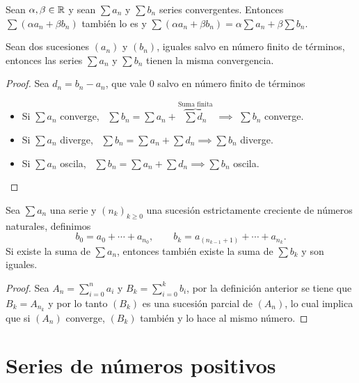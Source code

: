 \begin{prop}[Linealidad]
    Sean $\alpha, \beta \in \mathbb{R}$ y sean $\sum a_n$ y $\sum b_n$ series convergentes.
    Entonces $\sum (\alpha a_n + \beta b_n)$ también lo es y $\sum (\alpha a_n + \beta b_n)
    = \alpha \sum a_n + \beta \sum b_n$.
\end{prop}

\begin{prop}
    Sean dos sucesiones $(a_n)$ y $(b_n)$, iguales salvo en número finito de términos,
    entonces las series $\sum a_n$ y $\sum b_n$ tienen la misma convergencia.
\end{prop}

\begin{proof}
    Sea $d_n = b_n - a_n$, que vale 0 salvo en número finito de términos
    \begin{itemize}
        \item Si $\sum a_n$ converge, \, $\sum b_n = \sum a_n +
        \overbrace{\sum d_n}^\text{Suma finita}$ $\implies$ $\sum b_n$ converge.
        \item Si $\sum a_n$ diverge, \, $\sum b_n = \sum a_n + \sum d_n
        \implies \sum b_n$ diverge.
        \item Si $\sum a_n$ oscila, \, $\sum b_n = \sum a_n + \sum d_n
        \implies \sum b_n$ oscila.
    \end{itemize}
\end{proof}

\begin{prop}[Asociatividad]
    Sea $\sum a_n$ una serie y $(n_k)_{k \geq 0}$ una sucesión estrictamente creciente de
    números naturales, definimos
    \[
        b_0 = a_0 + \cdots + a_{n_0}, \qquad b_k = a_{(n_{k-1}+1)} + \cdots + a_{n_k}.
    \]
    Si existe la suma de $\sum a_n$, entonces también existe la suma de $\sum b_k$
    y son iguales.
\end{prop}

\begin{proof}
    Sea $A_n = \sum\limits_{i=0}^{n} a_i$ y $B_k = \sum\limits_{i=0}^{k} b_i$, por la
    definición anterior se tiene que $B_k = A_{n_k}$ y por lo tanto $(B_k)$ es una sucesión
    parcial de $(A_n)$, lo cual implica que si $(A_n)$ converge, $(B_k)$ también
    y lo hace al mismo número.
\end{proof}

\section{Series de números positivos}

